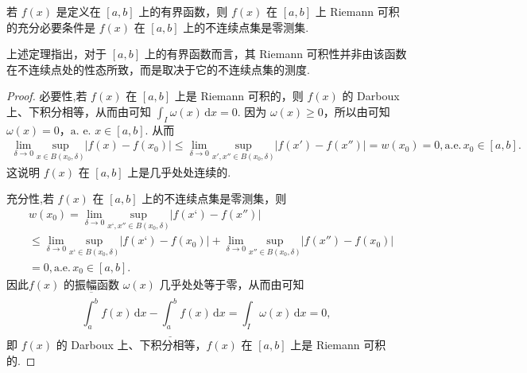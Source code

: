 \documentclass[../../main.tex]{subfiles}
\begin{document}
\begin{theorem}\label{theorem:定理4.24}
若 \( f(x) \) 是定义在 \( [a,b] \) 上的有界函数，则 \( f(x) \) 在 \( [a,b] \) 上 Riemann 可积的充分必要条件是 \( f(x) \) 在 \( [a,b] \) 上的不连续点集是零测集.
\end{theorem}
\begin{note}
上述定理指出，对于 \( [a,b] \) 上的有界函数而言，其 Riemann 可积性并非由该函数在不连续点处的性态所致，而是取决于它的不连续点集的测度.
\end{note}
\begin{proof}
必要性,若 \( f(x) \) 在 \( [a,b] \) 上是 Riemann 可积的，则 \( f(x) \) 的 Darboux 上、下积分相等，从而由可知 \( \int_I \omega(x) \, \mathrm{d}x = 0 \). 因为 \( \omega(x) \geqslant  0 \)，所以由可知\( \omega(x) = 0 \)，\(\text{a. e.}\) \( x \in [a,b] \). 从而
\begin{align*}
\underset{\delta \rightarrow 0}{\lim}\underset{x\in B\left( x_0,\delta \right)}{\mathrm{sup}}|f(x)-f(x_0)|\leqslant \underset{\delta \rightarrow 0}{\lim}\underset{x',x'' \in B\left( x_0,\delta \right)}{\mathrm{sup}}|f\left( x' \right) -f\left( x'' \right) |=w(x_0)=0,\mathrm{a}.\mathrm{e}.\,x_0\in \left[ a,b \right] .
\end{align*}
这说明 \( f(x) \) 在 \( [a,b] \) 上是几乎处处连续的.

充分性,若 \( f(x) \) 在 \( [a,b] \) 上的不连续点集是零测集，则
\begin{align*}
&w(x_0)=\underset{\delta \rightarrow 0}{\lim}\underset{x‘,x'' \in B\left( x_0,\delta \right)}{\mathrm{sup}}|f\left( x‘\right) -f\left( x'' \right) |
\\
&\leqslant \underset{\delta \rightarrow 0}{\lim}\underset{x‘\in B\left( x_0,\delta \right)}{\mathrm{sup}}|f(x‘)-f(x_0)|+\underset{\delta \rightarrow 0}{\lim}\underset{x'' \in B\left( x_0,\delta \right)}{\mathrm{sup}}|f(x'' )-f(x_0)|
\\
&=0,\mathrm{a}.\mathrm{e}.\,x_0\in \left[ a,b \right] .
\end{align*}
因此\( f(x) \) 的振幅函数 \( \omega(x) \) 几乎处处等于零，从而由可知
\[
\overline{\int_a^b} f(x) \, \mathrm{d}x - \underline{\int_a^b} f(x) \, \mathrm{d}x = \int_I \omega(x) \, \mathrm{d}x = 0,
\]
即 \( f(x) \) 的 Darboux 上、下积分相等，\( f(x) \) 在 \( [a,b] \) 上是 Riemann 可积的.
\end{proof}
\end{document}
